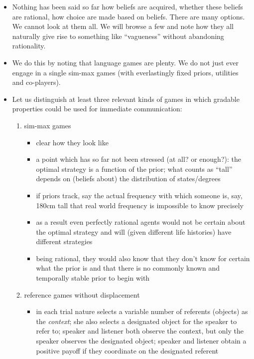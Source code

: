 \documentclass[fleqn,reqno,10pt]{article}
\begin{document}
\begin{itemize}
\item Nothing has been said so far how beliefs are acquired, whether these beliefs are
  rational, how choice are made based on beliefs. There are many options. We cannot look at
  them all. We will browse a few and note how they all naturally give rise to something like
  ``vagueness'' without abandoning rationality.
\item We do this by noting that language games are plenty. We do not just ever engage in a
  single sim-max games (with everlastingly fixed priors, utilities and co-players). 
\item Let us distinguish at least three relevant kinds of games in which gradable properties
  could be used for immediate communication:
  \begin{enumerate}
  \item sim-max games
    \begin{itemize}
    \item clear how they look like
    \item a point which has so far not been stressed (at all? or enough?): the optimal strategy
      is a function of the prior; what counts as ``tall'' depends on (beliefs about) the
      distribution of states/degrees
    \item if priors track, say the actual frequency with which someone is, say, 180cm tall that
      real world frequency is impossible to know precisely
    \item as a result even perfectly rational agents would not be certain about the optimal
      strategy and will (given different life histories) have different strategies
    \item being rational, they would also know that they don't know for certain what the prior
      is and that there is no commonly known and temporally stable prior to begin with
    \end{itemize}
  \item reference games without displacement
    \begin{itemize}
    \item in each trial nature selects a variable number of referents (objects) as the
      \emph{context}; she also selects a designated object for the speaker to refer to; speaker
      and listener both observe the context, but only the speaker observes the designated
      object; speaker and listener obtain a positive payoff if they coordinate on the
      designated referent \citep{Franke2012:Scales-Salience,Franke2012:On-Scales-Salie}

\end{itemize}
\end{enumerate}
\end{itemize}
\end{document}

